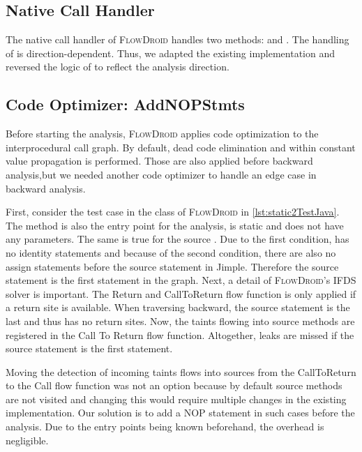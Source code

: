 \documentclass[../draft.tex]{subfiles}
\begin{document}
    \subsection{Native Call Handler}
    The native call handler of \textsc{FlowDroid} handles two methods:  and .
    The handling of  is direction-dependent.
    Thus, we adapted the existing implementation and reversed the logic of  to reflect the analysis direction.

    \subsection{Code Optimizer: AddNOPStmts}
    Before starting the analysis, \textsc{FlowDroid} applies code optimization to the interprocedural call graph.
    By default, dead code elimination and within constant value propagation is performed.
    Those are also applied before backward analysis,but we needed another code optimizer to handle an edge case in backward analysis.

    First, consider the  test case in the  class of \textsc{FlowDroid} in \autoref{lst:static2TestJava}.
    The method is also the entry point for the analysis, is static and does not have any parameters.
    The same is true for the source .
    Due to the first condition,  has no identity statements and because of the second condition, there are also no assign statements before the source statement in Jimple.
    Therefore the source statement is the first statement in the graph.
    Next, a detail of \textsc{FlowDroid}'s IFDS solver is important.
    The Return and CallToReturn flow function is only applied if a return site is available.
    When traversing backward, the source statement is the last and thus has no return sites.
    Now, the taints flowing into source methods are registered in the Call To Return flow function.
    Altogether, leaks are missed if the source statement is the first statement.

    Moving the detection of incoming taints flows into sources from the CallToReturn to the Call flow function was not an option because by default source methods are not visited and changing this would require multiple changes in the existing implementation.
    Our solution is to add a NOP statement in such cases before the analysis.
    Due to the entry points being known beforehand, the overhead is negligible.
\end{document}
